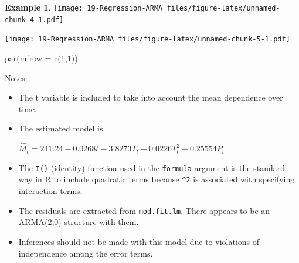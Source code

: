 \documentclass[
]{book}
\newenvironment{Shaded}{\begin{snugshade}}{\end{snugshade}}
\newcommand{\AttributeTok}[1]{\textcolor[rgb]{0.77,0.63,0.00}{#1}}
\newcommand{\DecValTok}[1]{\textcolor[rgb]{0.00,0.00,0.81}{#1}}
\newcommand{\FunctionTok}[1]{\textcolor[rgb]{0.00,0.00,0.00}{#1}}
\newcommand{\NormalTok}[1]{#1}
\newcommand{\SpecialCharTok}[1]{\textcolor[rgb]{0.00,0.00,0.00}{#1}}
\newcommand{\StringTok}[1]{\textcolor[rgb]{0.31,0.60,0.02}{#1}}
\theoremstyle{definition}
\theoremstyle{definition}
\newtheorem{example}{Example}[chapter]
\theoremstyle{definition}
\theoremstyle{definition}
\theoremstyle{remark}
\begin{document}
\begin{example}
\texttt{[image: 19-Regression-ARMA\_files/figure-latex/unnamed-chunk-4-1.pdf]}

\begin{Shaded}
\end{Shaded}

\texttt{[image: 19-Regression-ARMA\_files/figure-latex/unnamed-chunk-5-1.pdf]}

\begin{Shaded}
\begin{Highlighting}[]
\FunctionTok{par}\NormalTok{(}\AttributeTok{mfrow =} \FunctionTok{c}\NormalTok{(}\DecValTok{1}\NormalTok{,}\DecValTok{1}\NormalTok{))}
\end{Highlighting}
\end{Shaded}

Notes:

\begin{itemize}
\item
  The t variable is included to take into account the mean dependence over time.
\item
  The estimated model is

  \(\hat M_t= 241.24 - 0.0268t - 3.8273T_t + 0.0226T_t^2 + 0.25554P_t\)
\item
  The \texttt{I()} (identity) function used in the \texttt{formula} argument is the standard way in R to include quadratic terms because \texttt{\^{}2} is associated with specifying interaction terms.
\item
  The residuals are extracted from \texttt{mod.fit.lm}. There appears to be an ARMA(2,0) structure with them.
\item
  Inferences should not be made with this model due to violations of independence among the error terms.
\end{itemize}


\end{example}
\end{document}
